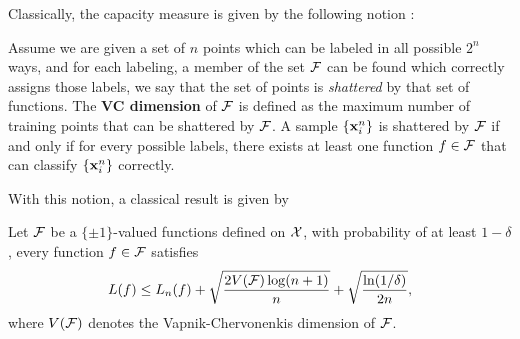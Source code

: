 Classically, the capacity measure is given by the following notion
\cite{Vapnik98}:
\begin{definition} \label{def:vc-dim}
Assume we are given a set of $n$ points which can be labeled in all
possible $2^n$ ways, and for each labeling, a member of the set ${\cal F}$ can
be found which correctly assigns those labels, we say that the set of points
is {\em shattered} by that set of functions. The {\bf VC dimension} of
${\cal F}$ is defined as the maximum number of training points that can be
shattered by ${\cal F}$. A sample $\{\mathbf{x}_i^n\}$ is shattered by ${\cal F}$  if and only if
for every possible labels, there exists at least one function $f \in {\cal F}$ that
can classify $\{\mathbf{x}_i^n\}$ correctly.
\end{definition}


With this notion, a classical result is given by
\begin{theorem} \label{thm:bnd-vc}
Let ${\cal F}$ be a $\{\pm1\}$-valued functions defined on ${\cal X}$, with probability of at
least $1-\delta$, every function $f \in {\cal F}$ satisfies
\begin{equation}
L(f) \leq L_n(f) + \sqrt{\frac{2V(\f)\log(n+1)}{n}}+ \sqrt{\frac{\ln(1 / \delta)}{2n}}, \label{eqn:bnd-vc}
\end{equation}
where $V({\cal F})$ denotes the Vapnik-Chervonenkis dimension of ${\cal F}$.
\end{theorem}
%
